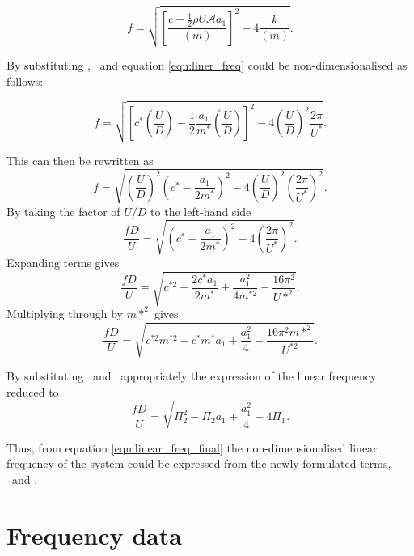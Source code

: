 \begin{equation}
\label{eqn:liner_freq}
f = \sqrt{\left[\frac{c-\frac{1}{2}\rho U\mathcal{A}a_1}{(m)}\right]^2-4\frac{k}{(m)}}.
\end{equation}



By substituting \cstar, \mstar\ and \ustar equation \ref{eqn:liner_freq} could be non-dimensionalised as follows:

\begin{equation}
f = \sqrt{\left[c^*\left(\frac{U}{D}\right) - \frac{1}{2}\frac{a_1}{m^*}\left(\frac{U}{D}\right)\right]^2 - 4\left(\frac{U}{D}\right)^2\frac{2\pi}{U^*}}.
\end{equation}

This can then be rewritten as
\begin{equation}
f = \sqrt{\left(\frac{U}{D}\right)^2\left(c^*-\frac{a_1}{2m^*}\right)^2 - 4\left(\frac{U}{D}\right)^2\left(\frac{2\pi}{U^*}\right)^2}.
\end{equation}
By taking the factor of $U/D$ to the left-hand side
\begin{equation}
\frac{fD}{U} = \sqrt{\left(c^*-\frac{a_1}{2m^*}\right)^2 - 4\left(\frac{2\pi}{U^*}\right)^2}.
\end{equation}
Expanding terms gives
\begin{equation}
\frac{fD}{U} = \sqrt{c^{*2} - \frac{2c^*a_1}{2m^*} + \frac{a_1^2}{4m^{*2}} - \frac{16\pi^2}{U*^2}}.
\end{equation}
Multiplying through by $m*^2$ gives
\begin{equation}
\frac{fD}{U} = \sqrt{c^{*2}m^{*2} - c^*m^*a_1 + \frac{a_1^2}{4} - \frac{16\pi^2m{*^2}}{U^{*2}}}.
\end{equation}


By substituting \massstiff\ and \massdamp\ appropriately the expression of the linear frequency reduced to   
\begin{equation}
\label{eqn:linear_freq_final}
\frac{fD}{U} = \sqrt{\Pi_2^2 - \Pi_2a_1 + \frac{a_1^2}{4} - 4\Pi_1}.
\end{equation}

Thus, from equation \ref{eqn:linear_freq_final} the non-dimensionalised linear frequency of the system could be expressed from the newly formulated terms, \massstiff\ and \massdamp.

\section{Frequency data}

